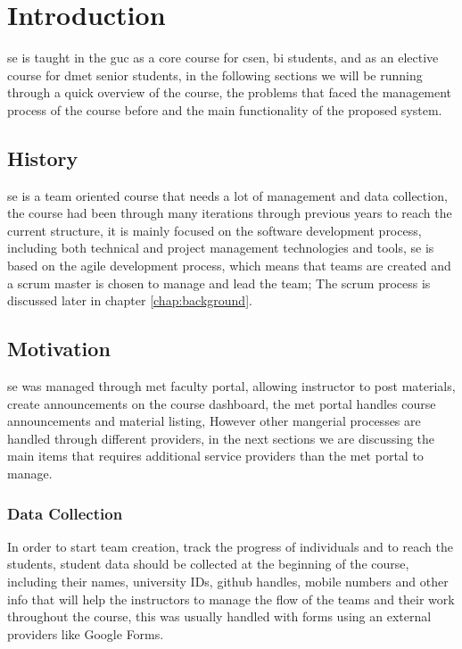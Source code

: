 \chapter{Introduction}
\label{chap:intro}

\ac{se} is taught in the \ac{guc} as a core course for \ac{csen}, \ac{bi} students, and as an elective course for \ac{dmet} senior students, in the following
sections we will be running through a quick overview of the course, the problems that faced the management process of the course before and the main
functionality of the proposed system.

\section{History}
\label{sec:history}
\ac{se} is a team oriented course that needs a lot of management and data collection, the course had been through many iterations through previous years
to reach the current structure, it is mainly focused on the software development process, including both technical and project management
technologies and tools, \ac{se} is based on the agile development process, which means that teams are created and a scrum master is chosen to manage
and lead the team; The scrum process is discussed later in chapter \ref{chap:background}.

\section{Motivation}
\label{sec:motivation}

\ac{se} was managed through \ac{met} faculty portal, allowing instructor to post materials,
create announcements on the course dashboard, the \ac{met} portal handles course announcements and material listing, However other
mangerial processes are handled through different providers, in the next sections we are discussing the main items that requires
additional service providers than the \ac{met} portal to manage.


\subsection{Data Collection}
\label{sub:data-collection}

In order to start team creation, track the progress of individuals and to reach the students, student data should be collected
at the beginning of the course, including their names, university IDs, github handles, mobile numbers and other info that will
help the instructors to manage the flow of the teams and their work throughout the course, this was usually handled with
forms using an external providers like Google Forms.

